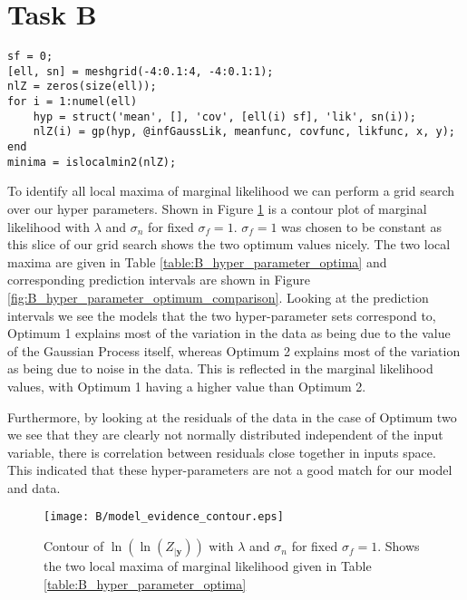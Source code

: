 \documentclass[11pt, twocolumn]{article}
\begin{document}
\section{Task B}

\begin{figure*}[h]
\begin{lstlisting}[caption=Code to sweep $\lambda$ and $\sigma_n$ to identify local minima of $\log(Z_{|\textbf{y}})$, captionpos=b, basicstyle=\small, frame=tlrb]
sf = 0;
[ell, sn] = meshgrid(-4:0.1:4, -4:0.1:1);
nlZ = zeros(size(ell));
for i = 1:numel(ell)
    hyp = struct('mean', [], 'cov', [ell(i) sf], 'lik', sn(i));
    nlZ(i) = gp(hyp, @infGaussLik, meanfunc, covfunc, likfunc, x, y);
end
minima = islocalmin2(nlZ);
\end{lstlisting}
\label{lst:B}
\end{figure*}

To identify all local maxima of marginal likelihood we can perform a grid search over our hyper parameters. Shown in Figure \ref{fig:B_marginal_liklihood_contour} is a contour plot of marginal likelihood with $\lambda$ and $\sigma_n$ for fixed $\sigma_f = 1$. $\sigma_f = 1$ was chosen to be constant as this slice of our grid search shows the two optimum values nicely. The two local maxima are given in Table \ref{table:B_hyper_parameter_optima} and corresponding prediction intervals are shown in Figure \ref{fig:B_hyper_parameter_optimum_comparison}. Looking at the prediction intervals we see the models that the two hyper-parameter sets correspond to, Optimum 1 explains most of the variation in the data as being due to the value of the Gaussian Process itself, whereas Optimum 2 explains most of the variation as being due to noise in the data. This is reflected in the marginal likelihood values, with Optimum 1 having a higher value than Optimum 2. 

Furthermore, by looking at the residuals of the data in the case of Optimum two we see that they are clearly not normally distributed independent of the input variable, there is correlation between residuals close together in inputs space. This indicated that these hyper-parameters are not a good match for our model and data.

\begin{figure}[h]
    \centering
    \texttt{[image: B/model\_evidence\_contour.eps]}
    \caption{Contour of $\ln(\ln(Z_{|\textbf{y}}))$ with $\lambda$ and $\sigma_n$ for fixed $\sigma_f = 1$. Shows the two local maxima of marginal likelihood given in Table \ref{table:B_hyper_parameter_optima}}
    \label{fig:B_marginal_liklihood_contour}
\end{figure}
\end{document}
